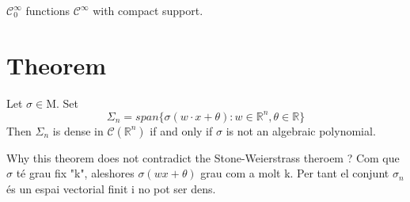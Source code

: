 \documentclass[../main.tex]{subfiles}
\begin{document}
	\begin{definition} 
	$ \mathcal{C}^\infty_0$ functions $\mathcal{C}^\infty$ with compact support.  
\end{definition}

\section{Theorem}
\begin{theorem} Let $ \sigma \in \text{M} $. Set
	$$ \Sigma_n = span\{\sigma(w\cdot x + \theta) : w\in \mathbb{R}^n, \theta \in \mathbb{R} \}$$
	Then $\Sigma_n$ is dense in $\mathcal{C}(\mathbb{R}^n)$ if and only if $\sigma$ is not an algebraic polynomial. 
	
\end{theorem}

Why this theorem does not contradict the Stone-Weierstrass theroem ?  Com que $\sigma$ té grau fix "k", aleshores $\sigma (wx+\theta) $ grau com a molt k. Per tant el conjunt $\sigma_n$ és un espai vectorial finit i no pot ser dens. 
\end{document}
